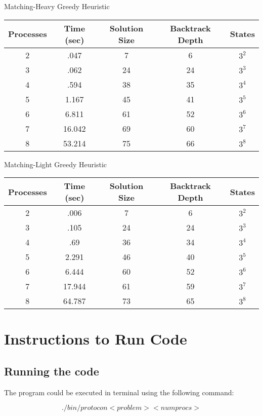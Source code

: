 \begin{center}
Matching-Heavy Greedy Heuristic \\
\begin{tabular}{|c|c|c|c|c|}
\hline
 Processes & Time (sec) & Solution Size & Backtrack Depth & States \\
\hline         
 2 & .047 & 7 & 6 & $3^{2}$        \\
 3 & .062 & 24 & 24 & $3^{3}$       \\
 4 & .594 & 38 & 35 & $3^{4}$      \\
 5 & 1.167 & 45 & 41 & $3^{5}$      \\
 6 & 6.811 & 61 & 52 & $3^{6}$     \\
 7 & 16.042 & 69 & 60 & $3^{7}$    \\
 8 & 53.214 & 75 & 66 & $3^{8}$    \\
\hline
\end{tabular}

Matching-Light Greedy Heuristic \\
\begin{tabular}{|c|c|c|c|c|}
\hline
 Processes & Time (sec) & Solution Size & Backtrack Depth & States \\
\hline         
 2 & .006 & 7 & 6 & $3^{2}$        \\
 3 & .105 & 24 & 24 & $3^{3}$       \\
 4 & .69 & 36 & 34 & $3^{4}$      \\
 5 & 2.291 & 46 & 40 & $3^{5}$      \\
 6 & 6.444 & 60 & 52 & $3^{6}$     \\
 7 & 17.944 & 61 & 59 & $3^{7}$    \\
 8 & 64.787 & 73 & 65 & $3^{8}$    \\
\hline
\end{tabular}
\end{center}

\section{Instructions to Run Code}
\subsection{Running the code}
The program could be executed in terminal using the following command:

\[
  ./bin/protocon <problem> <numprocs>
\]


